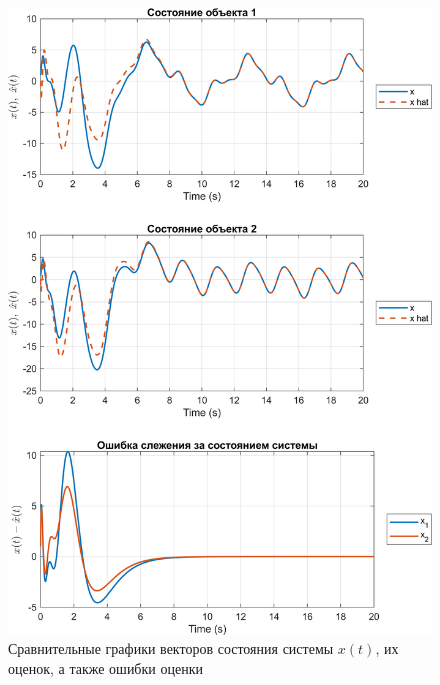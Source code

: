 \begin{figure}[H]
    \centering
    \includegraphics[width=\linewidth]{figs/2fig1.png}
    \caption{Сравнительные графики векторов состояния системы $x(t)$,
    их оценок, а также ошибки оценки}
    \label{fig:2fig1}
\end{figure}
